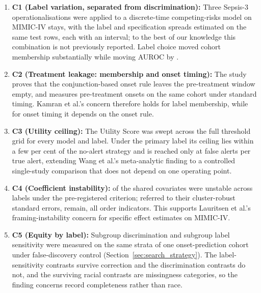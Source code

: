 \begin{enumerate}
    \item \textbf{C1 (Label variation, separated from discrimination):} Three
    Sepsis-3 operationalisations were applied to a discrete-time
    competing-risks model on \pcNStays{} MIMIC-IV stays, with the label and
    specification spreads estimated on the same test rows, each with an
    interval; to the best of our knowledge this combination is not previously
    reported. Label choice moved cohort membership substantially while moving
    AUROC by \pcSpreadLabel.

    \item \textbf{C2 (Treatment leakage: membership and onset timing):} The
    study proves that the conjunction-based onset rule leaves the
    pre-treatment window empty, and measures \pcPreTreatOnsetsVarF{}
    pre-treatment onsets on the same cohort under standard timing. Kamran et
    al.'s \cite{kamran2024evaluation} concern therefore holds for label
    membership, while for onset timing it depends on the onset rule.

    \item \textbf{C3 (Utility ceiling):} The Utility Score was swept across the
    full threshold grid for every model and label. Under the primary label its
    ceiling lies within a few per cent of the no-alert strategy and is reached
    only at \pcUtilityOptBurdenGbtB{} false alerts per true alert, extending
    Wang et al.'s \cite{wang2025srpm} meta-analytic finding to a controlled
    single-study comparison that does not depend on one operating point.

    \item \textbf{C4 (Coefficient instability):} \pcHTwoEst{} of the
    \pcHTwoNTerms{} shared covariates were unstable across labels under the
    pre-registered criterion; referred to their cluster-robust standard
    errors, \pcHTwoNRobust{} remain, all order indicators. This supports
    Lauritsen et al.'s \cite{lauritsen2021framing} framing-instability concern
    for specific effect estimates on MIMIC-IV.

    \item \textbf{C5 (Equity by label):} Subgroup discrimination and subgroup
    label sensitivity were measured on the same strata of one onset-prediction
    cohort under false-discovery control (Section~\ref{sec:search_strategy}).
    The label-sensitivity contrasts survive correction and the discrimination
    contrasts do not, and the surviving racial contrasts are missingness
    categories, so the finding concerns record completeness rather than race.


\end{enumerate}
